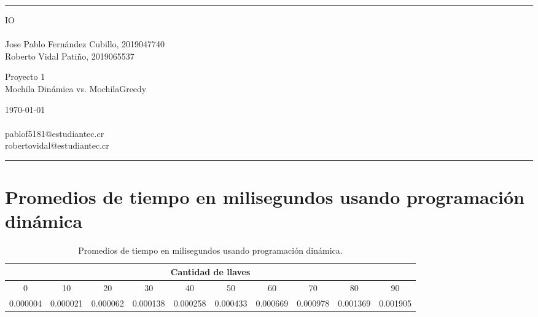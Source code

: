 \documentclass[a4paper]{article}
\begin{document}

\fancyhead[C]{}
\hrule \medskip %
\begin{minipage}{0.295\textwidth} %
\raggedright
IO\\ %
\footnotesize %
\hfill\\
Jose Pablo Fernández Cubillo, 2019047740 \\%
Roberto Vidal Patiño, 2019065537%
\end{minipage}
\begin{minipage}{0.4\textwidth} %
\centering 
\large %
Proyecto 1\\ %
\normalsize %
Mochila Dinámica vs. MochilaGreedy\\ %
\end{minipage}
\begin{minipage}{0.295\textwidth} %
\raggedleft
\today\\ %
\footnotesize %
\hfill\\
pablof5181@estudiantec.cr\\
robertovidal@estudiantec.cr%
\end{minipage}
\medskip\hrule %
\bigskip

\section{Promedios de tiempo en milisegundos usando programación dinámica}

\begin{table}[H]
\centering
\relax
\resizebox{\textwidth}{!} {%
\begin{tabular}{|c|c|c|c|c|c|c|c|c|c|}
\hline
 \multicolumn{10}{|c|}{\textbf{Cantidad de llaves}} \\
 \hline 
0 & 10 & 20 & 30 & 40 & 50 & 60 & 70 & 80 & 90 \\
\hline
0.000004 & 0.000021 & 0.000062 & 0.000138 & 0.000258 & 0.000433 & 0.000669 & 0.000978 & 0.001369 & 0.001905 \\
\hline
\end{tabular}%
}
\caption{Promedios de tiempo en milisegundos usando programación dinámica.}
\end{table}
\end{document}
